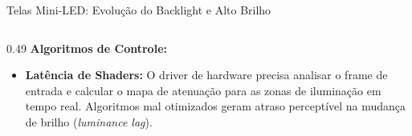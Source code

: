 \begin{frame}{Telas Mini-LED: Evolução do Backlight e Alto Brilho}
{\begin{columns}[T]
            \begin{column}{0.49\textwidth}    
                \textbf{Algoritmos de Controle:}
                \begin{itemize}
                    \setlength{\itemsep}{1pt}
                    \item \textbf{Latência de Shaders:} O driver de hardware precisa analisar o frame de entrada e calcular o mapa de atenuação para as zonas de iluminação em tempo real. Algoritmos mal otimizados geram atraso perceptível na mudança de brilho (\textit{luminance lag}).
                \end{itemize}
            \end{column}
        \end{columns}
    }
\end{frame}

